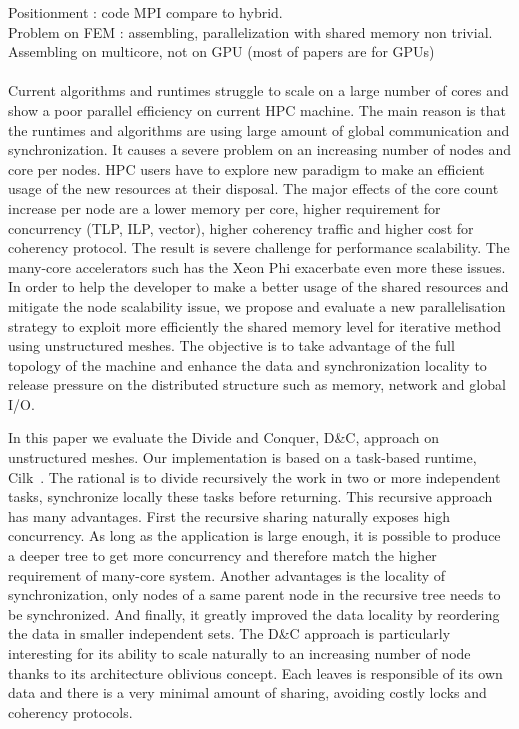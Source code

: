 \documentclass{IOS-Book-Article}
\begin{document}
Positionment : code MPI compare to hybrid.\\
Problem on FEM : assembling, parallelization with shared memory non trivial.\\
Assembling on multicore, not on GPU (most of papers are for GPUs)\\\\

Current algorithms and runtimes struggle to scale on a large number of cores and show a poor parallel efficiency on current HPC machine. The main reason is that the runtimes
and algorithms are using large amount of global communication and synchronization. It causes a severe problem on an increasing number of nodes and core per nodes.
HPC users have to explore new paradigm to make an efficient usage of the new resources at their disposal. 
The major effects of the core count increase per node are a lower memory per core, higher requirement for concurrency (TLP, ILP, vector), higher coherency traffic and higher
cost for coherency protocol. The result is severe challenge for performance scalability. The many-core accelerators such has the Xeon Phi exacerbate even more these issues. 
In order to help the developer to make a better usage of the shared resources and mitigate the node scalability issue, we propose and evaluate a new parallelisation strategy 
 to exploit more efficiently the shared memory level for iterative method using unstructured meshes. The objective is to take advantage of the full topology of the machine and
 enhance the data and synchronization locality to release pressure on the distributed structure such as memory, network and global I/O. 

In this paper we evaluate the Divide and Conquer, D\&C, approach on  unstructured meshes. Our implementation is based on a task-based runtime, Cilk~\cite{cilk5}.
The rational is to divide recursively the work in two or more independent tasks, synchronize locally these tasks before returning. This recursive approach has many advantages.
First the recursive sharing naturally exposes high concurrency. As long as the application is large enough, it is possible to produce a deeper tree to get more concurrency
and therefore match the higher requirement of many-core system. Another advantages is the locality of synchronization, only nodes of a same parent node in the recursive
tree needs to be synchronized. And finally, it greatly improved the data locality by reordering the data in smaller independent sets. The D\&C approach is particularly
interesting for its ability to scale naturally to an increasing number of node thanks to its architecture oblivious concept.
Each leaves is responsible of its own data and there is a very minimal amount of sharing, avoiding costly locks and coherency protocols. 
\end{document}
